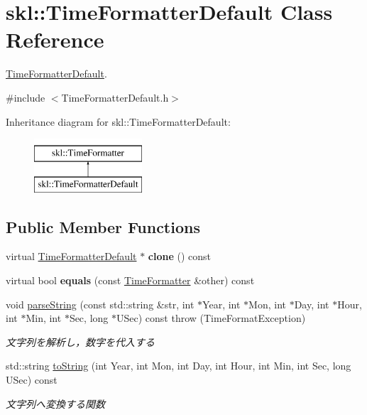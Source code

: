 \hypertarget{classskl_1_1_time_formatter_default}{}\section{skl\+:\+:Time\+Formatter\+Default Class Reference}
\label{classskl_1_1_time_formatter_default}


\hyperlink{classskl_1_1_time_formatter_default}{Time\+Formatter\+Default}.  




{\ttfamily \#include $<$Time\+Formatter\+Default.\+h$>$}

Inheritance diagram for skl\+:\+:Time\+Formatter\+Default\+:\begin{figure}[H]
\begin{center}
\leavevmode
\includegraphics[height=2.000000cm]{classskl_1_1_time_formatter_default}
\end{center}
\end{figure}
\subsection*{Public Member Functions}
\begin{DoxyCompactItemize}
\item 
\hypertarget{classskl_1_1_time_formatter_default_a5cddc15b60b466a86a5f963de1ad8e90}{}\label{classskl_1_1_time_formatter_default_a5cddc15b60b466a86a5f963de1ad8e90} 
virtual \hyperlink{classskl_1_1_time_formatter_default}{Time\+Formatter\+Default} $\ast$ {\bfseries clone} () const
\item 
\hypertarget{classskl_1_1_time_formatter_default_a80774f6fcf15b18e7edb78a5e4d3c01a}{}\label{classskl_1_1_time_formatter_default_a80774f6fcf15b18e7edb78a5e4d3c01a} 
virtual bool {\bfseries equals} (const \hyperlink{classskl_1_1_time_formatter}{Time\+Formatter} \&other) const
\item 
void \hyperlink{classskl_1_1_time_formatter_default_a803104c1e78b366dc9f4c6fecb632c11}{parse\+String} (const std\+::string \&str, int $\ast$Year, int $\ast$Mon, int $\ast$Day, int $\ast$Hour, int $\ast$Min, int $\ast$Sec, long $\ast$U\+Sec) const  throw (\+Time\+Format\+Exception)
\begin{DoxyCompactList}\small\item\em 文字列を解析し，数字を代入する \end{DoxyCompactList}\item 
std\+::string \hyperlink{classskl_1_1_time_formatter_default_aa0636a112004da1d9646c127d10bf9d8}{to\+String} (int Year, int Mon, int Day, int Hour, int Min, int Sec, long U\+Sec) const
\begin{DoxyCompactList}\small\item\em 文字列へ変換する関数 \end{DoxyCompactList}\end{DoxyCompactItemize}
